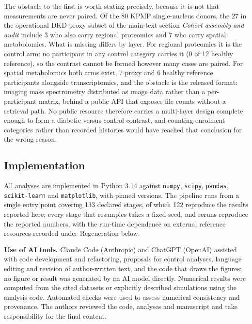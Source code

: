 \documentclass[11pt]{article}
\begin{document}
The obstacle to the first is worth stating precisely, because it is not that measurements are never paired. Of the 80 KPMP single-nucleus donors, the 27 in the operational DKD-proxy subset of the main-text section \textit{Cohort assembly and audit} include 3 who also carry regional proteomics and 7 who carry spatial metabolomics. What is missing differs by layer. For regional proteomics it is the control arm: no participant in any control category carries it (0 of 12 healthy reference), so the contrast cannot be formed however many cases are paired. For spatial metabolomics both arms exist, 7 proxy and 6 healthy reference participants alongside transcriptomics, and the obstacle is the released format: imaging mass spectrometry distributed as image data rather than a per-participant matrix, behind a public API that exposes file counts without a retrieval path. No public resource therefore carries a multi-layer design complete enough to form a diabetic-versus-control contrast, and counting enrolment categories rather than recorded histories would have reached that conclusion for the wrong reason.



\label{note:S9}
\subsection{Implementation}\label{sec:implementation}

All analyses are implemented in Python 3.14 against \texttt{numpy}, \texttt{scipy},
\texttt{pandas}, \texttt{scikit-learn} and \texttt{matplotlib}, with pinned versions. The
pipeline runs from a single entry point covering 133 declared stages, of which 122 reproduce the
results reported here; every stage that resamples takes a fixed seed, and reruns reproduce the
reported numbers, with the run-time dependence on external reference resources recorded
under Regeneration below.

\textbf{Use of AI tools.} Claude Code (Anthropic) and ChatGPT (OpenAI) assisted with code
development and refactoring, proposals for control analyses, language editing and revision of
author-written text, and the code that draws the figures; no figure or result was generated by
an AI model directly. Numerical results were computed from the cited datasets or explicitly
described simulations using the analysis code. Automated checks were used to assess numerical
consistency and provenance. The authors reviewed the code, analyses and manuscript and take
responsibility for the final content.
\end{document}
